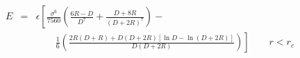


\begin{eqnarray}
E &=& \epsilon \left[ \frac{\sigma^{6}}{7560} 
  \left(\frac{6R-D}{D^{7}} + \frac{D+8R}{(D+2R)^{7}} \right) - 
  \frac{}{} \right. \nonumber \\
  &&\qquad \left. \frac{1}{6} \left(\frac{2R(D+R) + D(D+2R)
    \left[ \ln D - \ln (D+2R) \right]}{D(D+2R)} \right) \right] 
\qquad r < r_c \nonumber
\end{eqnarray}


